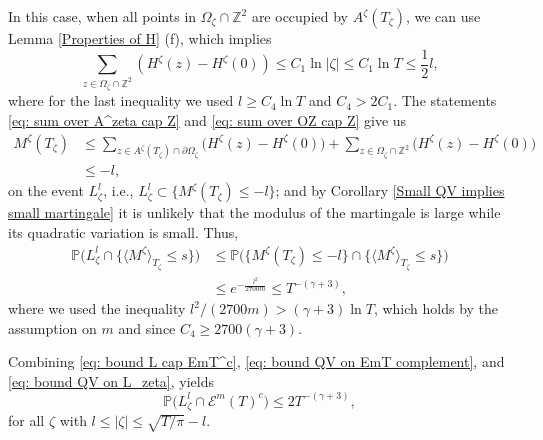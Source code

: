 \documentclass[11pt]{article}
\makeatletter
\renewenvironment{proof}[1][\proofname]{
   \par\pushQED{\qed}\normalfont
   \topsep6\p@\@plus6\p@\relax
   \trivlist\item[\hskip\labelsep\bfseries#1\@addpunct{.}]
   \ignorespaces
}{
   \popQED\endtrivlist\@endpefalse
}
\numberwithin{equation}{section}
\def\OZ{\Omega_{\zeta}}
\def\QV{\langle M ^{\zeta} \rangle}
\makeatother
\begin{document}
\begin{proof}[Proof of Lemma \ref{Late Points Imply Early Points}]
  In this case, when all points in $\OZ \cap \mathbb{Z}^2$ are occupied by $A^{\zeta}(T_{\zeta})$, 
  we can use Lemma \ref{Properties of H} (f), which implies 
  \begin{equation}\label{eq: sum over OZ cap Z}
    \sum_{z \in \OZ \cap \mathbb{Z}^2}
    (H^{\zeta}(z) - H^{\zeta}(0))
    \leq C_1 \ln |\zeta| 
    \leq C_1 \ln T 
    \leq \frac{1}{2} l,
  \end{equation}
  where for the last inequality we used $ l \geq C_4 \ln T$ and $C_4 > 2 C_1$.
  The statements \eqref{eq: sum over A^zeta cap Z} and \eqref{eq: sum over OZ cap Z} give us 
  \begin{equation} \nonumber
    \begin{split}
      M^{\zeta}(T_{\zeta})
      & \leq 
        \sum_{z \in A^{\zeta}(T_{\zeta}) \cap \partial \OZ}
        \big( H^{\zeta}(z) - H^{\zeta}(0) \big) + 
        \sum_{z \in \OZ \cap \mathbb{Z}^2}
      \big(H^{\zeta}(z) - H^{\zeta}(0) \big)  \\
      & \leq -l,
    \end{split}
  \end{equation}
  on the event $L^l_{\zeta}$, i.e., 
  $L^l_{\zeta} \subset \{M^{\zeta}(T_{\zeta}) \leq -l \}$;
  and by Corollary \ref{Small QV implies small martingale} 
  it is unlikely that the modulus of the martingale 
  is large while its quadratic variation is small. Thus, 
  \begin{equation}\label{eq: bound QV on L_zeta}
    \begin{split}
        \mathbb{P} \big(L^l_{\zeta} \cap \{ \QV_{T_{\zeta}} \leq s \} \big)
      & \leq 
      \mathbb{P} \big(\{M^{\zeta}(T_{\zeta}) \leq -l \} \cap \{ \QV_{T_{\zeta}} \leq s \} \big)\\ 
      & \leq e^{-\frac{l^2}{2700m}} \leq T^{-(\gamma + 3)},
    \end{split}
  \end{equation}
  where we used the inequality $l^2/(2700m) > (\gamma + 3) \ln T$, 
  which holds by the assumption on $m$ and since $C_4 \geq 2700(\gamma + 3)$. 

  Combining \eqref{eq: bound L cap EmT^c}, \eqref{eq: bound QV on EmT complement}, 
  and  \eqref{eq: bound QV on L_zeta}, yields 
  $$
    \mathbb{P} \big( L^l_{\zeta} \cap \mathcal{E}^m(T)^c \big)
    \leq 2 T^{-(\gamma + 3)},
  $$ 
  for all $\zeta$ with $l \leq |\zeta| \leq \sqrt{T/\pi} - l$.


\end{proof}
\end{document}
